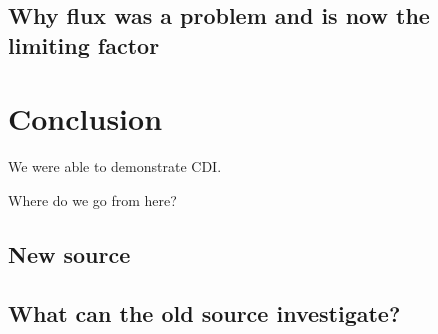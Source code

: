 \section{Why flux was a problem and is now the limiting factor}



\chapter{Conclusion}

We were able to demonstrate CDI.

Where do we go from here?

\section{New source}

\section{What can the old source investigate?}


